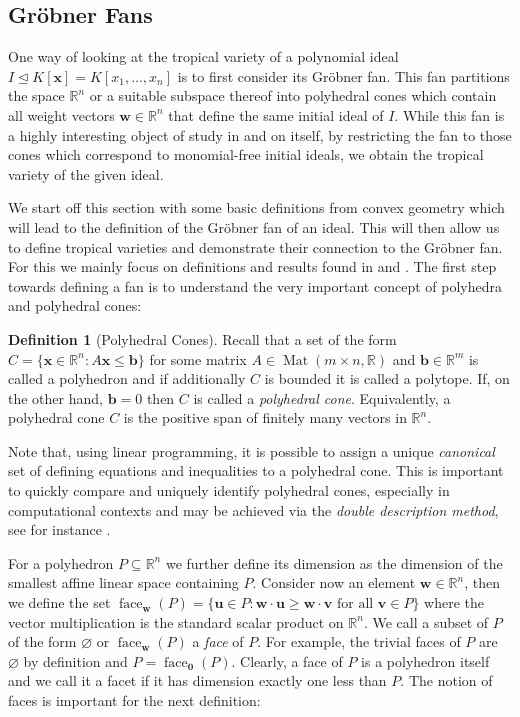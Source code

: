 \documentclass[
  paper=a4,
  titlepage,
  bibliography=totoc,
  pagesize=pdftex
]{scrartcl}
\numberwithin{figure}{section}
\numberwithin{equation}{section}
\numberwithin{table}{section}
\newcommand*\setR{\mathds{R}}
\let\vec\mathbf
\let\idealof\trianglelefteq
\DeclareMathOperator{\Mat}{Mat}
\DeclareMathOperator{\face}{face}
\theoremstyle{definition}
\newtheorem{definition}{Definition}
\numberwithin{definition}{section}
\begin{document}
\subsection{Gröbner Fans}
\label{sec:grobFan}

One way of looking at the tropical variety of a polynomial ideal $I \idealof K[\vec x] =
K[x_1, \dots, x_n]$ is to first consider its Gröbner fan. This fan partitions the space
$\setR^n$ or a suitable subspace thereof into polyhedral cones which contain all weight
vectors $\vec w\in \setR^n$ that define the same initial ideal of $I$. While this fan is a
highly interesting object of study in and on itself, by restricting the fan to those cones
which correspond to monomial-free initial ideals, we obtain the tropical variety of the
given ideal.

We start off this section with some basic definitions from convex geometry which will lead
to the definition of the Gröbner fan of an ideal. This will then allow us to define
tropical varieties and demonstrate their connection to the Gröbner fan. For this we mainly
focus on definitions and results found in \cite{compGrobFan} and \cite{SturmGBCP}. The
first step towards defining a fan is to understand the very important concept of polyhedra
and polyhedral cones:

\begin{definition}[Polyhedral Cones]
  \label{def:polyhedralCone}
  Recall that a set of the form $C = \{ \vec x \in \setR^n : A\vec x \leq \vec b \}$ for
  some matrix $A \in \Mat(m\times n, \setR)$ and $\vec b \in \setR^m$ is called a
  polyhedron and if additionally $C$ is bounded it is called a polytope. If, on the other
  hand, $\vec b = 0$ then $C$ is called a \emph{polyhedral cone}. Equivalently, a
  polyhedral cone $C$ is the positive span of finitely many vectors in $\setR^n$.
\end{definition}

Note that, using linear programming, it is possible to assign a unique \emph{canonical}
set of defining equations and inequalities to a polyhedral cone. This is important to
quickly compare and uniquely identify polyhedral cones, especially in computational
contexts and may be achieved via the \emph{double description method}, see for instance
\cite{fuDD}.

For a polyhedron $P \subseteq \setR^n$ we further define its dimension as the dimension of
the smallest affine linear space containing $P$. Consider now an element $\vec w \in
\setR^n$, then we define the set $\face_{\vec w}(P) = \{ \vec u \in P : \vec w\cdot \vec u
\geq \vec w \cdot \vec v \text{ for all } \vec v\in P\}$ where the vector multiplication
is the standard scalar product on $\setR^n$. We call a subset of $P$ of the form
$\varnothing$ or $\face_{\vec w}(P)$ a \emph{face} of $P$. For example, the trivial faces
of $P$ are $\varnothing$ by definition and $P = \face_{\vec 0}(P)$. Clearly, a face of $P$
is a polyhedron itself and we call it a facet if it has dimension exactly one less than
$P$. The notion of faces is important for the next definition:
\end{document}
